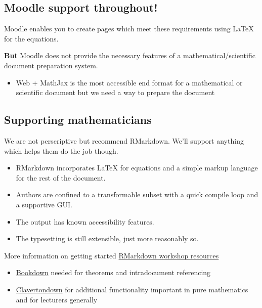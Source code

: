 \documentclass[
  10pt,
  a4paper]{article}
\providecommand{\tightlist}{%
  \setlength{\itemsep}{0pt}\setlength{\parskip}{0pt}}
\begin{document}
\hypertarget{moodle-support-throughout}{%
\subsection{Moodle support throughout!}\label{moodle-support-throughout}}

Moodle enables you to create pages which meet these requirements using LaTeX for the equations.

\textbf{But} Moodle does not provide the necessary features of a mathematical/scientific document preparation system.

\begin{itemize}
\tightlist
\item
  Web + MathJax is the most accessible end format for a mathematical or scientific document but we need a way to prepare the document
\end{itemize}

\hypertarget{supporting-mathematicians}{%
\subsection{Supporting mathematicians}\label{supporting-mathematicians}}

We are not perscriptive but recommend RMarkdown. We'll support anything which helps them do the job though.

\begin{itemize}
\tightlist
\item
  RMarkdown incorporates LaTeX for equations and a simple markup language for the rest of the document.
\item
  Authors are confined to a transformable subset with a quick compile loop and a supportive GUI.
\item
  The output has known accessibility features.
\item
  The typesetting is still extensible, just more reasonably so.
\end{itemize}

More information on getting started \href{https://stem-enable.github.io/RMarkdownWorkshop/}{RMarkdown workshop resources}

\begin{itemize}
\tightlist
\item
  \href{https://bookdown.org/}{Bookdown} needed for theorems and intradocument referencing
\item
  \href{https://bathmash.github.io/clavertondown/}{Clavertondown} for additional functionality important in pure mathematics and for lecturers generally
\end{itemize}
\end{document}
